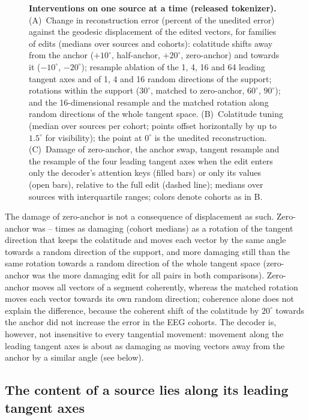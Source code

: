 \documentclass[10pt,letterpaper]{article}
\begin{document}
\begin{figure}[!ht]
\caption{{\bf Interventions on one source at a time (released tokenizer).}
(A)~Change in reconstruction
  error (percent of the unedited error) against the geodesic displacement of the edited vectors, for
  families of edits (medians over sources and cohorts): colatitude shifts away from the anchor
  ($+10^\circ$, half-anchor, $+20^\circ$, zero-anchor) and towards it ($-10^\circ$, $-20^\circ$);
  resample ablation of the 1, 4, 16 and 64 leading tangent axes and of 1, 4 and 16 random directions
  of the support; rotations within the support ($30^\circ$, matched to zero-anchor, $60^\circ$,
  $90^\circ$); and the 16-dimensional resample and the matched rotation along random directions of
  the whole tangent space. (B)~Colatitude tuning (median over sources per cohort; points offset horizontally by up to
  $1.5^\circ$ for visibility); the point at
  $0^\circ$ is the unedited reconstruction. (C)~Damage of zero-anchor, the anchor swap, tangent
  resample and the resample of the four leading tangent axes when the edit enters only the decoder's
  attention keys (filled bars) or only its values (open bars), relative to the full edit (dashed
  line); medians over sources with interquartile ranges; colors denote cohorts as in B.}
\label{fig:interventions}
\end{figure}

The damage of zero-anchor is not a consequence of displacement as such. Zero-anchor was
\LatitudeRatioMin--\LatitudeRatioMax{} times as damaging (cohort medians) as a rotation of the
tangent direction that keeps the colatitude and moves each vector by the same angle towards a
random direction of the support, and more damaging still than the same rotation towards a
random direction of the whole tangent space (zero-anchor was the more damaging edit for all
\SourceCohortPairs{} pairs in both comparisons\GuardLatitudeAll). Zero-anchor
moves all vectors of a segment coherently, whereas the matched rotation moves each vector towards
its own random direction; coherence alone does not explain the difference, because the coherent
shift of the colatitude by $20^\circ$ towards the anchor did not increase the error in the EEG
cohorts. The
decoder is, however, not insensitive to every tangential movement: movement along the leading
tangent axes is about as damaging as moving vectors away from the anchor by a similar angle
(see below).



\subsection*{The content of a source lies along its leading tangent axes}\label{sec:res-content}
\end{document}

